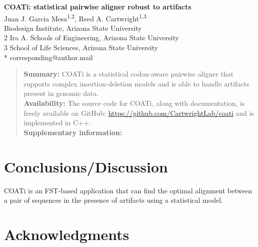 



\begin{flushleft}
{\Large\textbf{COATi: statistical pairwise aligner robust to artifacts}}
\newline
\\
Juan J. Garcia Mesa\textsuperscript{1,2},
Reed A. Cartwright\textsuperscript{1,3}
\\
 Biodesign Institute, Arizona State University
\\
2 Ira A. Schools of Engineering, Arizona State University
\\
3 School of Life Sciences, Arizona State University
\\
\bigskip
* corresponding@author.mail

\end{flushleft}

\begin{abstract}
\noindent \textbf{Summary:} COATi is a statistical codon-aware pairwise aligner
that supports complex insertion-deletion models and is able to handle artifacts
present in genomic data.\\  %
\textbf{Availability:} The source code for COATi, along with documentation, is
freely available on GitHub: \url{https://github.com/CartwrightLab/coati} and is
implemented in C++.\\
\textbf{Supplementary information:} %
\end{abstract}


\linenumbers







\section{Conclusions/Discussion}

COATi is an FST-based application that can find the optimal alignment between a
pair of sequences in the presence of artifacts using a statistical model.

\section*{Acknowledgments}

